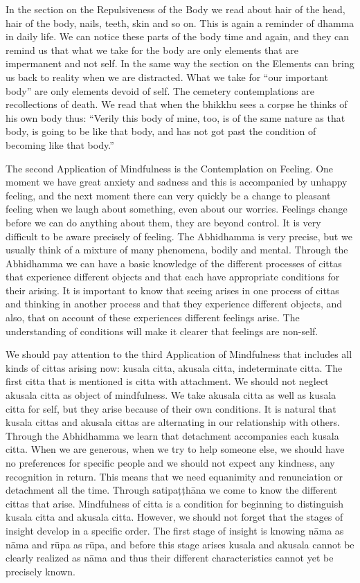 In the section on the Repulsiveness of the Body we read about hair of the head, hair of the body, nails, teeth, skin and so on. This is again a reminder of dhamma in daily life. We can notice these parts of the body time and again, and they can remind us that what we take for the body are only elements that are impermanent and not self. In the same way the section on the Elements can bring us back to reality when we are distracted. What we take for ``our important body'' are only elements devoid of self. The cemetery contemplations are recollections of death. We read that when the bhikkhu sees a corpse he thinks of his own body thus: ``Verily this body of mine, too, is of the same nature as that body, is going to be like that body, and has not got past the condition of becoming like that body.''

The second Application of Mindfulness is the Contemplation on Feeling. One moment we have great anxiety and sadness and this is accompanied by unhappy feeling, and the next moment there can very quickly be a change to pleasant feeling when we laugh about something, even about our worries. Feelings change before we can do anything about them, they are beyond control. It is very difficult to be aware precisely of feeling. The Abhidhamma is very precise, but we usually think of a mixture of many phenomena, bodily and mental. Through the Abhidhamma we can have a basic knowledge of the different processes of cittas that experience different objects and that each have appropriate conditions for their arising. It is important to know that seeing arises in one process of cittas and thinking in another process and that they experience different objects, and also, that on account of these experiences different feelings arise. The understanding of conditions will make it clearer that feelings are non-self.

We should pay attention to the third Application of Mindfulness that includes all kinds of cittas arising now: kusala citta, akusala citta, indeterminate citta. The first citta that is mentioned is citta with attachment. We should not neglect akusala citta as object of mindfulness. We take akusala citta as well as kusala citta for self, but they arise because of their own conditions. It is natural that kusala cittas and akusala cittas are alternating in our relationship with others. Through the Abhidhamma we learn that detachment accompanies each kusala citta. When we are generous, when we try to help someone else, we should have no preferences for specific people and we should not expect any kindness, any recognition in return. This means that we need equanimity and renunciation or detachment all the time. Through satipaṭṭhāna we come to know the different cittas that arise. Mindfulness of citta is a condition for beginning to distinguish kusala citta and akusala citta. However, we should not forget that the stages of insight develop in a specific order. The first stage of insight is knowing nāma as nāma and rūpa as rūpa, and before this stage arises kusala and akusala cannot be clearly realized as nāma and thus their different characteristics cannot yet be precisely known.

